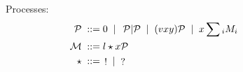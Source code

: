 \begin{figure}[h!]
  Processes:
    \begin{align*}
      \mathcal{P} \; ::= \; & 0 \;\mid\; \, \mathcal{P} | \mathcal{P} \;\mid\; (vxy)\mathcal{P} \;\mid\; x\sum{}_iM_i\\
      \mathcal{M} \; ::= \; & l \star x \mathcal{P}\\
      \star \; ::= \; & \mathop! \;\mid\; \mathop?
    \end{align*}
\end{figure}


